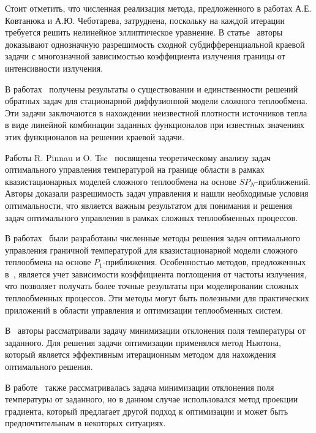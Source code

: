 Стоит отметить, что численная реализация метода, предложенного в работах А.Е. Ковтанюка и А.Ю. Чеботарева,
затруднена, поскольку на каждой итерации требуется решить нелинейное эллиптическое уравнение.
В статье~\cite{Chebotarev2016Odnaznachnaya} авторы доказывают однозначную разрешимость
сходной субдифференциальной краевой задачи с многозначной зависимостью коэффициента излучения
границы от интенсивности излучения.

В работах~\cite{astrakhantseva2017analysis, chebotarev2018inverse} получены результаты о существовании
и единственности решений обратных задач для стационарной диффузионной модели сложного теплообмена.
Эти задачи заключаются в нахождении неизвестной плотности источников тепла в виде линейной комбинации
заданных функционалов при известных значениях этих функционалов на решении краевой задачи.

Работы R. Pinnau и O. Tse~\cite{Pinnau2007, Pinnau2013} посвящены теоретическому анализу задач
оптимального управления температурой на границе области в рамках квазистационарных моделей сложного
теплообмена на основе $SP_N$-приближений.
Авторы доказали разрешимость задач управления и нашли необходимые условия оптимальности,
что является важным результатом для понимания и решения задач оптимального управления
в рамках сложных теплообменных процессов.

В работах~\cite{
    clever2012optimal, clever2014model, lang2005adaptive, frank2011adaptive, Pinnau2007b, Pinnau2013,
} были разработаны численные методы решения задач оптимального управления граничной температурой
для квазистационарной модели сложного теплообмена на основе $P_1$-приближения.
Особенностью методов, предложенных в~\cite{clever2012optimal, clever2014model, lang2005adaptive},
является учет зависимости коэффициента поглощения от частоты излучения, что позволяет получать более
точные результаты при моделировании сложных теплообменных процессов.
Эти методы могут быть полезными для практических приложений
в области управления и оптимизации теплообменных систем.


В~\cite{frank2011adaptive, Pinnau2007b} авторы рассматривали задачу
минимизации отклонения поля температуры от заданного.
Для решения задачи оптимизации применялся метод Ньютона,
который является эффективным итерационным методом для нахождения оптимального решения.

В работе~\cite{lang2005adaptive} также рассматривалась задача минимизации
отклонения поля температуры от заданного, но в данном случае использовался метод проекции градиента,
который предлагает другой подход к оптимизации и может быть предпочтительным в некоторых ситуациях.

